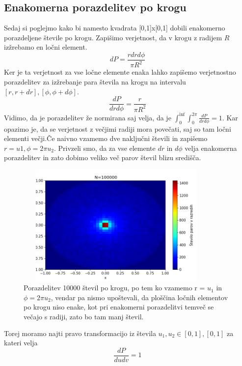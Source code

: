 \documentclass[11pt, a4paper]{article}
\begin{document}
\subsection{Enakomerna porazdelitev po krogu}
Sedaj si poglejmo kako bi namesto kvadrata [0,1]x[0,1] dobili enakomerno porazdeljene števile po krogu. Zapišimo verjetnost, da v krogu z radijem $R$ izžrebamo en ločni element.
\begin{equation}
dP = \frac{r dr d\phi}{\pi R^2}
\end{equation} 
Ker je ta verjetnost za vse ločne elemente enaka lahko zapišemo verjetnostno porazdelitev za izžrebanje para števila na krogu na intervalu $[r , r +dr], [ \phi, \phi + d \phi ]$.
\begin{equation}
\frac{dP}{dr d\phi} = \frac{r}{\pi R^2}
\end{equation} 
Vidimo, da je porazdelitev že normirana saj velja, da je $\int_{0}^{\inf} \int_{0}^{2 \pi} \frac{dP}{dr d\phi} = 1$. Kar opazimo je, da se verjetnost z večjimi radiji mora povečati, saj so tam ločni elementi večji.\newline\newline Če naivno vzamemo dve naključni števili in zapišemo $r = u1 , \phi = 2 \pi u_2$. Privzeli smo, da za vse elemente $dr$ in $d\phi$ velja enakomerna porazdelitev in zato dobimo veliko več parov števil blizu središča.
\begin{figure}[H]
\hspace*{-2.5cm}  
\centering
  \includegraphics[width=10cm,height=6cm]{druga_narobe.png}
 \caption{Porazdelitev 10000 števil po krogu, po tem ko vzamemo r = $u_1$ in $\phi = 2 \pi u_2$, vendar pa nismo upoštevali, da ploščina ločnih elementov po krogu niso enake, kot pri enakomerni porazdelitvi temveč se večajo s radiji, zato bo tam manj števil. }
\end{figure}
Torej moramo najti pravo transformacijo iz števila $u_1,u_2 \in [0,1],[0,1] $ za kateri velja
\begin{equation}
\frac{dP}{dudv} = 1
\end{equation}
\end{document}
